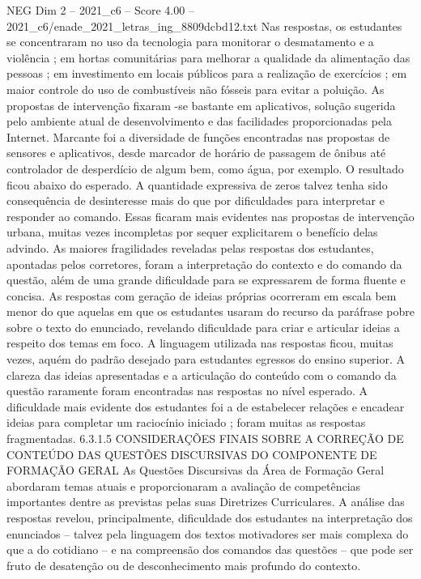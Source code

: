 \begin{textsample}{NEG Dim 2 – 2021\_c6 – Score 4.00 – 2021\_c6/enade\_2021\_letras\_ing\_8809dcbd12.txt}
Nas respostas, os estudantes se concentraram no uso da tecnologia para monitorar o desmatamento e a violência ; em hortas comunitárias para melhorar a qualidade da alimentação das pessoas ; em investimento em locais públicos para a realização de exercícios ; em maior controle do uso de combustíveis não fósseis para evitar a poluição.
As propostas de intervenção fixaram -se bastante em aplicativos, solução sugerida pelo ambiente atual de desenvolvimento e das facilidades proporcionadas pela Internet.
Marcante foi a diversidade de funções encontradas nas propostas de sensores e aplicativos, desde marcador de horário de passagem de ônibus até controlador de desperdício de algum bem, como água, por exemplo.
O resultado ficou abaixo do esperado.
A quantidade expressiva de zeros talvez tenha sido consequência de desinteresse mais do que por dificuldades para interpretar e responder ao comando.
Essas ficaram mais evidentes nas propostas de intervenção urbana, muitas vezes incompletas por sequer explicitarem o benefício delas advindo.
As maiores fragilidades reveladas pelas respostas dos estudantes, apontadas pelos corretores, foram a interpretação do contexto e do comando da questão, além de uma grande dificuldade para se expressarem de forma fluente e concisa.
As respostas com geração de ideias próprias ocorreram em escala bem menor do que aquelas em que os estudantes usaram do recurso da paráfrase pobre sobre o texto do enunciado, revelando dificuldade para criar e articular ideias a respeito dos temas em foco.
A linguagem utilizada nas respostas ficou, muitas vezes, aquém do padrão desejado para estudantes egressos do ensino superior.
A clareza das ideias apresentadas e a articulação do conteúdo com o comando da questão raramente foram encontradas nas respostas no nível esperado.
A dificuldade mais evidente dos estudantes foi a de estabelecer relações e encadear ideias para completar um raciocínio iniciado ; foram muitas as respostas fragmentadas. 6.3.1.5 CONSIDERAÇÕES FINAIS SOBRE A CORREÇÃO DE CONTEÚDO DAS QUESTÕES DISCURSIVAS DO COMPONENTE DE FORMAÇÃO GERAL As Questões Discursivas da Área de Formação Geral abordaram temas atuais e proporcionaram a avaliação de competências importantes dentre as previstas pelas suas Diretrizes Curriculares.
A análise das respostas revelou, principalmente, dificuldade dos estudantes na interpretação dos enunciados – talvez pela linguagem dos textos motivadores ser mais complexa do que a do cotidiano – e na compreensão dos comandos das questões – que pode ser fruto de desatenção ou de desconhecimento mais profundo do contexto.

\end{textsample}
